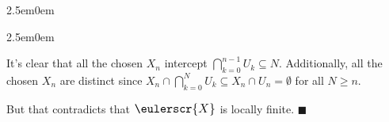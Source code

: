 \documentclass{book}
\newcommand{\mathcalli}[1]{\text{\scalebox{1.11}{$\eulerscr{#1}$}}}
\newenvironment{myIndent}{%
   \begin{adjustwidth}{2.5em}{0em}%
}{%
   \end{adjustwidth}%
}
\newcommand{\retTwo}{\hfill\bigbreak}
\begin{document}
\begin{itemize}
\begin{myIndent}
\begin{myIndent}
			It's clear that all the chosen $X_n$ intercept $\bigcap_{k=0}^{n-1} U_k \subseteq N$. Additionally, all the chosen $X_n$ are distinct since $X_n \cap \bigcap_{k=0}^{N} U_k \subseteq X_n \cap U_n = \emptyset$ for all $N \geq n$.\retTwo
		\end{myIndent}

		But that contradicts that $\mathcalli{X}$ is locally finite. $\blacksquare$\retTwo
	\end{myIndent}
\end{itemize}
\end{document}
